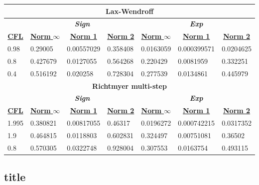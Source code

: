 \begin{table}[]
\begin{tabular}{|l|l|l|l|l|l|l|}
						\multicolumn{7}{|c|}{\textbf{Lax-Wendroff}} \\ \hline
						& \multicolumn{3}{|c|}{\textit{\textbf{Sign}}} & \multicolumn{3}{|c|}{\textit{\textbf{Exp}}} \\ \hline
						\multicolumn{1}{|c|}{{\ul \textbf{CFL}}} & \multicolumn{1}{|c|}{{\ul \textbf{Norm }$\infty$}} & \multicolumn{1}{|c|}{{\ul \textbf{Norm 1}}} & \multicolumn{1}{|c|}{{\ul \textbf{Norm 2}}} & \multicolumn{1}{|c|}{{\ul \textbf{Norm }$\infty$}} & \multicolumn{1}{|c|}{{\ul \textbf{Norm 1}}} & \multicolumn{1}{|c|}{{\ul \textbf{Norm 2}}} \\ \hline \hline
						0.98 & 0.29005 & 0.00557029 & 0.358408 & 0.0163059 & 0.000399571 & 0.0204625 \\ \hline
						0.8 & 0.427679 & 0.0127055 & 0.564268 & 0.220429 & 0.0081959 & 0.332251 \\ \hline
						0.4 & 0.516192 & 0.020258 & 0.728304 & 0.277539 & 0.0134861 & 0.445979 \\ \hline \hline
												
						\multicolumn{7}{|c|}{\textbf{Richtmyer multi-step}} \\ \hline
						& \multicolumn{3}{|c|}{\textit{\textbf{Sign}}} & \multicolumn{3}{|c|}{\textit{\textbf{Exp}}} \\ \hline
						\multicolumn{1}{|c|}{{\ul \textbf{CFL}}} & \multicolumn{1}{|c|}{{\ul \textbf{Norm }$\infty$}} & \multicolumn{1}{|c|}{{\ul \textbf{Norm 1}}} & \multicolumn{1}{|c|}{{\ul \textbf{Norm 2}}} & \multicolumn{1}{|c|}{{\ul \textbf{Norm }$\infty$}} & \multicolumn{1}{|c|}{{\ul \textbf{Norm 1}}} & \multicolumn{1}{|c|}{{\ul \textbf{Norm 2}}} \\ \hline \hline
						1.995 & 0.380821 & 0.00817055 & 0.46317 & 0.0196272 & 0.000742215 & 0.0317352 \\ \hline
						1.9 & 0.464815 & 0.0118803 & 0.602831 & 0.324497 & 0.00751081 & 0.36502 \\ \hline
						0.8 & 0.570305 & 0.0322748 & 0.928004 & 0.307553 & 0.0163754 & 0.493115 \\ \hline \hline
					\end{tabular}
				\end{table}
	\subsection{title}
